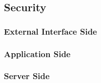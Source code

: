 \subsection{Security}

	\subsubsection{External Interface Side}

	\subsubsection{Application Side}

	\subsubsection{Server Side}